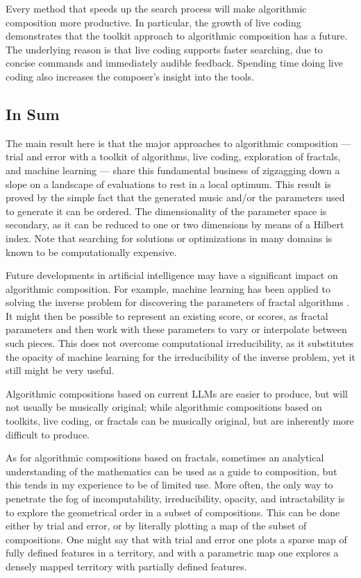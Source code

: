 \documentclass[11pt]{scrartcl}
\begin{document}
Every method that speeds up the search process will make algorithmic composition more productive. In particular, the growth of live coding demonstrates that the toolkit approach to algorithmic composition has a future. The underlying reason is that live coding supports faster searching, due to concise commands and immediately audible feedback. Spending time doing live coding also increases the composer's insight into the tools.

\subsection*{In Sum}

The main result here is that the major approaches to algorithmic composition --- trial and error with a toolkit of algorithms, live coding, exploration of fractals, and machine learning --- share this fundamental business of zigzagging down a slope on a landscape of evaluations to rest in a local optimum. This result is proved by the simple fact that the generated music and/or the parameters used to generate it can be ordered. The dimensionality of the parameter space is secondary, as it can be reduced to one or two dimensions by means of a Hilbert index. Note that searching for solutions or optimizations in many domains is known to be computationally expensive.

Future developments in artificial intelligence may have a significant impact on algorithmic composition. For example, machine learning has been applied to solving the inverse problem for discovering the parameters of fractal algorithms \parencite{tu2023learning}. It might then be possible to represent an existing score, or scores, as fractal parameters and then work with these parameters to vary or interpolate between such pieces. This does not overcome computational irreducibility, as it substitutes the opacity of machine learning for the irreducibility of the inverse problem, yet it still might be very useful.

 Algorithmic compositions based on current LLMs are easier to produce, but will not usually be musically original; while algorithmic compositions based on toolkits, live coding, or fractals can be musically original, but are inherently more difficult to produce.

As for algorithmic compositions based on fractals, sometimes an analytical understanding of the mathematics can be used as a guide to composition, but this tends in my experience to be of limited use. More often, the only way to penetrate the fog of incomputability, irreducibility, opacity, and intractability is to explore the geometrical order in a subset of compositions. This can be done either by trial and error, or by literally plotting a map of the subset of compositions. One might say that with trial and error one plots a sparse map of fully defined features in a territory, and with a parametric map one explores a densely mapped territory with partially defined features.
\end{document}
